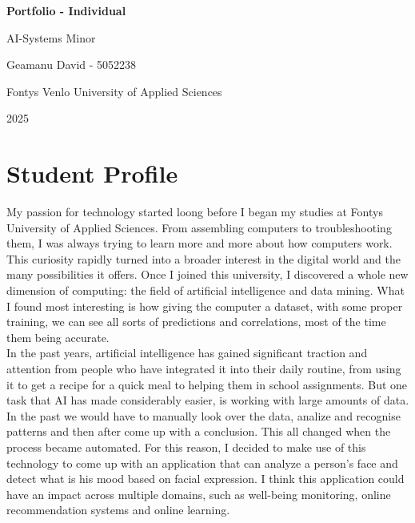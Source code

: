 \documentclass[12pt,a4paper]{article}
\begin{document}
\begin{titlepage}
  \centering
  \vspace*{3cm}
  {\LARGE\bfseries Portfolio - Individual\par}
  \vspace{0.8cm}
  {\Large AI-Systems Minor\par}
  \vspace{2.5cm}
  {\Large Geamanu David - 5052238\par}
  \vspace{0.8cm}
  {\large Fontys Venlo University of Applied Sciences\par}
  \vspace{0.8cm}
  {\large 2025\par}
  \vfill
\end{titlepage}
\clearpage

\setcounter{page}{1}
\tableofcontents
\clearpage


\section{Student Profile}
My passion for technology started loong before I began my studies at Fontys University of Applied Sciences. From assembling computers to troubleshooting them, I was always trying to learn more and more about how computers work. This curiosity rapidly turned into a broader interest in the digital world and the many possibilities it offers. Once I joined this university, I discovered a whole new dimension of computing: the field of artificial intelligence and data mining. What I found most interesting is how giving the computer a dataset, with some proper training, we can see all sorts of predictions and correlations, most of the time them being accurate. \\
In the past years, artificial intelligence has gained significant traction and attention from people who have integrated it into their daily routine, from using it to get a recipe for a quick meal to helping them in school assignments. But one task that AI has made considerably easier, is working with large amounts of data. In the past we would have to manually look over the data, analize and recognise patterns and then after come up with a conclusion. This all changed when the process became automated. For this reason, I decided to make use of this technology to come up with an application that can analyze a person's face and detect what is his mood based on facial expression. I think this application could have an impact across multiple domains, such as well-being monitoring, online recommendation systems and online learning.
\end{document}
